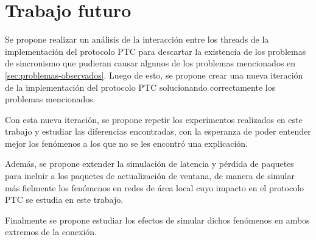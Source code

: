 \documentclass[a4paper, 10pt, twoside]{article}
\begin{document}


\section{Trabajo futuro}

Se propone realizar un análisis de la interacción entre los threads de la implementación del protocolo PTC para descartar la existencia de los problemas de sincronismo que pudieran causar algunos de los problemas mencionados en \ref{sec:problemas-observados}. Luego de esto, se propone crear una nueva iteración de la implementación del protocolo PTC solucionando correctamente los problemas mencionados.

Con esta nueva iteración, se propone repetir los experimentos realizados en este trabajo y estudiar las diferencias encontradas, con la esperanza de poder entender mejor los fenómenos a los que no se les encontró una explicación.

Además, se propone extender la simulación de latencia y pérdida de paquetes para incluir a los paquetes de actualización de ventana, de manera de simular más fielmente los fenómenos en redes de área local cuyo impacto en el protocolo PTC se estudia en este trabajo.

Finalmente se propone estudiar los efectos de simular dichos fenómenos en ambos extremos de la conexión.
\end{document}
